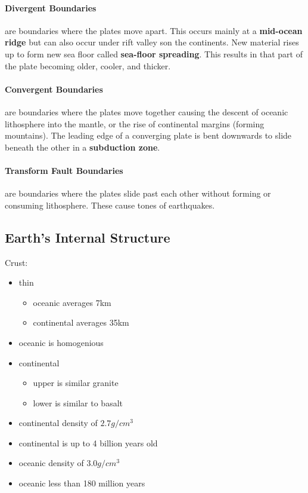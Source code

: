 \documentclass{article}
\begin{document}
\paragraph{Divergent Boundaries} are boundaries where the plates move apart. This occurs mainly at a \textbf{mid-ocean ridge} but can also occur under rift valley son the continents. New material rises up to form new sea floor called \textbf{sea-floor spreading}. This results in that part of the plate becoming older, cooler, and thicker.

\paragraph{Convergent Boundaries} are boundaries where the plates move together causing the descent of oceanic lithosphere into the mantle, or the rise of continental margins (forming mountains). The leading edge of a converging plate is bent downwards to slide beneath the other in a \textbf{subduction zone}.

\paragraph{Transform Fault Boundaries} are boundaries where the plates slide past each other without forming or consuming lithosphere. These cause tones of earthquakes.

\subsection*{Earth's Internal Structure} %
\label{sub:earth_s_internal_structure}
Crust:
\begin{itemize}
    \item thin
    \begin{itemize}
         \item oceanic averages 7km
         \item continental averages 35km
     \end{itemize}
     \item oceanic is homogenious
     \item continental
     \begin{itemize}
         \item upper is similar granite
         \item lower is similar to basalt
     \end{itemize}
     \item continental density of $2.7 g/cm^3$
     \item continental is up to 4 billion years old
     \item oceanic density of $3.0 g/cm^3$
     \item oceanic less than 180 million years
\end{itemize}
\end{document}
